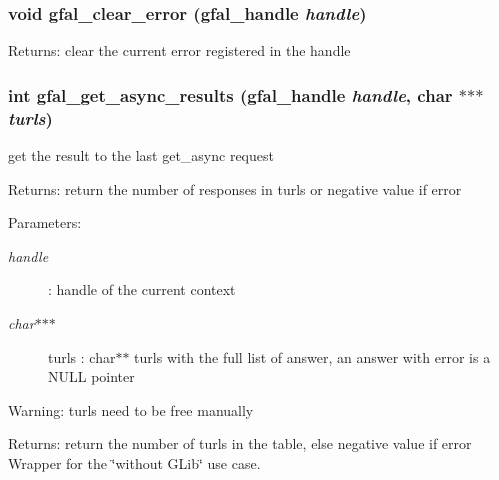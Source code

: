 \subsubsection{\setlength{\rightskip}{0pt plus 5cm}void gfal\_\-clear\_\-error (gfal\_\-handle {\em handle})}\label{gfal__common__interface_8h_4ca376cf47166fabd46a45fccb863ebe}


\begin{Desc}
\item[Returns:]clear the current error registered in the handle \end{Desc}
\subsubsection{\setlength{\rightskip}{0pt plus 5cm}int gfal\_\-get\_\-async\_\-results (gfal\_\-handle {\em handle}, char $\ast$$\ast$$\ast$ {\em turls})}\label{gfal__common__interface_8h_0c654545b837b8e1928842ee762ce5e9}


get the result to the last get\_\-async request \begin{Desc}
\item[Returns:]return the number of responses in turls or negative value if error \end{Desc}
\begin{Desc}
\item[Parameters:]
\begin{description}
\item[{\em handle}]: handle of the current context \item[{\em char$\ast$$\ast$$\ast$}]turls : char$\ast$$\ast$ turls with the full list of answer, an answer with error is a NULL pointer \end{description}
\end{Desc}
\begin{Desc}
\item[Warning:]turls need to be free manually \end{Desc}
\begin{Desc}
\item[Returns:]return the number of turls in the table, else negative value if error Wrapper for the \char`\"{}without GLib\char`\"{} use case. \end{Desc}
